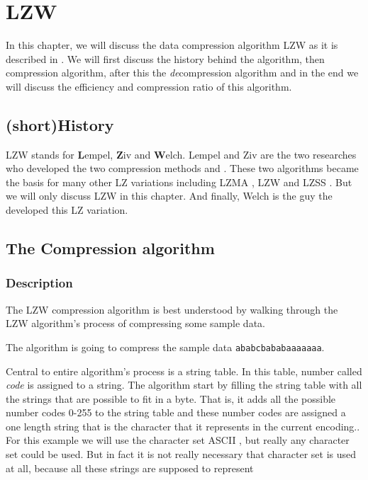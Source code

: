 \begin{comment}
  
\end{comment}

\chapter{LZW}
\label{cha:lzw}

\begin{refsection}

  In this chapter, we will discuss the data compression algorithm LZW
  as it is described in
  \cite{nelson89:_lzw_data_compr,Welch:1984:THD:1319729.1320134,Salomon:2004:DCC}. We
  will first discuss the history behind the algorithm, then
  compression algorithm, after this the
  \textit{de}compression algorithm and in the end we will discuss the
  efficiency and compression ratio of this algorithm.

\section{(short)History}

LZW stands for \textbf{L}empel, \textbf{Z}iv and
\textbf{W}elch. Lempel and Ziv are the two researches who developed
the two compression methods \lzseven and \lzeight. These two
algorithms became the basis for many other LZ variations including
LZMA \cite{palov11}, LZW and LZSS \cite{Salomon:2004:DCC}. But we
will only discuss LZW in this chapter. And finally, Welch is the guy
the developed this LZ variation.

\section{The Compression algorithm}

\subsection{Description}
\label{sec:lzw-desc}

The LZW compression algorithm is best
understood by walking through the LZW algorithm's process of
compressing some sample data.

The algorithm is going to compress the sample data
\texttt{ababcbababaaaaaaa}.

Central to entire algorithm's process is a string table. In this
table, number called \textit{code} is assigned to a
string. The algorithm start by filling the string table with all the
strings that are possible to fit in a byte. That is, it adds all the
possible number codes 0-255 to the string table and these number codes
are assigned a one length string that is the character that it
represents in the current encoding.. For this example we will use the
character set ASCII \cite{rfc20}, but really any character set could
be used. But in fact it is not really necessary that character set is
used at all, because all these strings are supposed to represent


\end{refsection}
